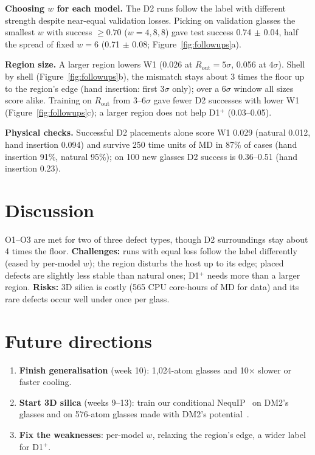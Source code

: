 \documentclass[10pt]{article}
\newcommand{\Dp}{D1$^{+}$}
\begin{document}
\textbf{Choosing $w$ for each model.} The D2 runs follow the label with different strength despite near-equal validation losses. Picking on validation glasses the smallest $w$ with success $\ge0.70$ ($w=4, 8, 8$) gave test success 0.74 $\pm$ 0.04, half the spread of fixed $w=6$ (0.71 $\pm$ 0.08; Figure~\ref{fig:followups}a).

\textbf{Region size.} A larger region lowers W1 (0.026 at $R_\text{out}=5\sigma$, 0.056 at $4\sigma$). Shell by shell (Figure~\ref{fig:followups}b), the mismatch stays about 3 times the floor up to the region's edge (hand insertion: first $3\sigma$ only); over a $6\sigma$ window all sizes score alike. Training on $R_\text{out}$ from 3--6$\sigma$ gave fewer D2 successes with lower W1 (Figure~\ref{fig:followups}c); a larger region does not help \Dp{} (0.03--0.05).

\textbf{Physical checks.} Successful D2 placements alone score W1 0.029 (natural 0.012, hand insertion 0.094) and survive 250 time units of MD in 87\% of cases (hand insertion 91\%, natural 95\%); on 100 new glasses D2 success is 0.36--0.51 (hand insertion 0.23).

\section{Discussion}

O1--O3 are met for two of three defect types, though D2 surroundings stay about 4 times the floor. \textbf{Challenges:} runs with equal loss follow the label differently (eased by per-model $w$); the region disturbs the host up to its edge; placed defects are slightly less stable than natural ones; \Dp{} needs more than a larger region. \textbf{Risks:} 3D silica is costly (565 CPU core-hours of MD for data) and its rare defects occur well under once per glass.

\section{Future directions}
\label{sec:next}
\begin{enumerate}
\item \textbf{Finish generalisation} (week 10): 1,024-atom glasses and 10$\times$ slower or faster cooling.
\item \textbf{Start 3D silica} (weeks 9--13): train our conditional NequIP~\citep{batzner2022nequip} on DM2's glasses and on 576-atom glasses made with DM2's potential~\citep{bouhadja2013}.
\item \textbf{Fix the weaknesses}: per-model $w$, relaxing the region's edge, a wider label for \Dp{}.
\end{enumerate}
\end{document}
